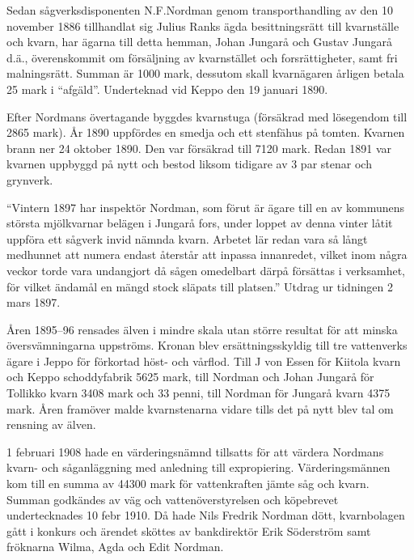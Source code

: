Sedan sågverksdisponenten N.F.Nordman genom transporthandling av den 10 november 1886 tillhandlat sig Julius Ranks ägda besittningsrätt till kvarnställe och kvarn, har ägarna till detta hemman, Johan Jungarå och Gustav Jungarå d.ä., överenskommit om försäljning av kvarnstället och forsrättigheter, samt fri malningsrätt. Summan är 1000 mark, dessutom skall kvarnägaren årligen betala 25 mark i ``afgäld''. Underteknad vid Keppo den 19 januari 1890.





Efter Nordmans övertagande byggdes kvarnstuga (försäkrad med lösegendom till 2865 mark). År 1890 uppfördes en smedja och ett stenfähus på tomten. Kvarnen brann ner 24 oktober 1890. Den var försäkrad till 7120 mark. Redan 1891 var kvarnen uppbyggd på nytt och bestod liksom tidigare av 3 par stenar och grynverk.

``Vintern 1897 har inspektör Nordman, som förut är ägare till en av kommunens största mjölkvarnar belägen i Jungarå fors, under loppet av denna vinter låtit uppföra ett sågverk invid nämnda kvarn. Arbetet lär redan vara så långt medhunnet att numera endast återstår att inpassa innanredet, vilket inom några veckor torde vara undangjort	då sågen omedelbart därpå försättas i verksamhet, för vilket ändamål en mängd stock släpats till platsen.'' Utdrag ur tidningen 2 mars 1897.

Åren 1895--96 rensades älven i mindre skala utan större resultat för att minska översvämningarna uppströms. Kronan blev ersättningsskyldig till tre vattenverks ägare i Jeppo för förkortad höst- och vårflod. Till J von Essen för Kiitola kvarn och Keppo schoddyfabrik 5625 mark, till Nordman och Johan Jungarå för Tollikko kvarn 3408 mark och 33 penni, till Nordman för Jungarå kvarn 4375 mark. Åren framöver malde kvarnstenarna vidare tills det på nytt blev tal om rensning av älven.


1 februari 1908 hade en värderingsnämnd tillsatts för att värdera Nordmans kvarn- och såganläggning med anledning till expropiering. Värderingsmännen kom till en summa av 44300 mark för vattenkraften jämte såg och kvarn. Summan godkändes av väg och vattenöverstyrelsen och köpebrevet undertecknades 10 febr 1910. Då hade Nils Fredrik Nordman dött, kvarnbolagen gått i konkurs och ärendet sköttes av bankdirektör Erik Söderström samt fröknarna Wilma, Agda och Edit Nordman.

